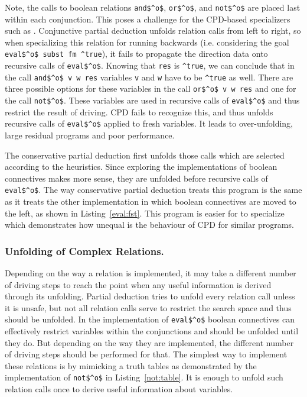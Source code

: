 Note, the calls to boolean relations \lstinline{and$^o$}, \lstinline{or$^o$}, and \lstinline{not$^o$} are placed last within each conjunction.
This poses a challenge for the CPD-based specializers such as \ecce.
Conjunctive partial deduction unfolds relation calls from left to right, so when specializing this relation for running backwards (i.e. considering the goal \lstinline{eval$^o$ subst fm ^true}), it fails to propagate the direction data onto recursive calls of \lstinline{eval$^o$}.
Knowing that \lstinline{res} is \lstinline{^true}, we can conclude that in the call \lstinline{and$^o$ v w res} variables \lstinline{v} and \lstinline{w} have to be \lstinline{^true} as well.
There are three possible options for these variables in the call \lstinline{or$^o$ v w res} and one for the call \lstinline{not$^o$}.
These variables are used in recursive calls of \lstinline{eval$^o$} and thus restrict the result of driving.
CPD fails to recognize this, and thus unfolds recursive calls of \lstinline{eval$^o$} applied to fresh variables.
It leads to over-unfolding, large residual programs and poor performance.

The conservative partial deduction first unfolds those calls which are selected according to the heuristics.
Since exploring the implementations of boolean connectives makes more sense, they are unfolded before recursive calls of \lstinline{eval$^o$}.
The way conservative partial deduction treats this program is the same as it treats the other implementation in which boolean connectives
are moved to the left, as shown in Listing~\ref{eval:fst}.
This program is easier for \ecce to specialize which demonstrates how unequal is the behaviour of CPD for similar programs.

\subsubsection{Unfolding of Complex Relations.}

Depending on the way a relation is implemented, it may take a different number of driving steps to reach the point when any useful information is derived through its unfolding.
Partial deduction tries to unfold every relation call unless it is unsafe, but not all relation calls serve to restrict the search space and thus should be unfolded.
In the implementation of \lstinline{eval$^o$} boolean connectives can effectively restrict variables within the conjunctions and should be unfolded until they do.
But depending on the way they are implemented, the different number of driving steps should be performed for that.
The simplest way to implement these relations is by mimicking a truth tables as demonstrated by the implementation of \lstinline{not$^o$} in Listing~\ref{not:table}.
It is enough to unfold such relation calls once to derive useful information about variables.


